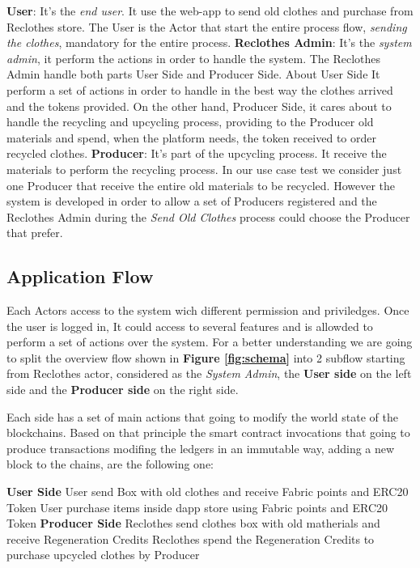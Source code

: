 \begin{outline}
    \1 \textbf{User}: It's the \textit{end user}. It use the web-app to send old clothes and purchase from Reclothes store.
    The User is the Actor that start the entire process flow, \textit{sending the clothes}, mandatory for the entire process. 
    \1 \textbf{Reclothes Admin}: It's the \textit{system admin}, it perform the actions in order to handle the system.
    The Reclothes Admin handle both parts User Side and Producer Side. About User Side It perform a set of actions
    in order to handle in the best way the clothes arrived and the tokens provided. On the other hand, Producer Side,
    it cares about to handle the recycling and upcycling process, providing to the Producer old materials
    and spend, when the platform needs, the token received to order recycled clothes.  
    \1 \textbf{Producer}: It's part of the upcycling process. It receive the materials to perform the recycling process.
    In our use case test we consider just one Producer that receive the entire old materials to be recycled.
    However the system is developed in order to allow a set of Producers registered and the Reclothes Admin
    during the \textit{Send Old Clothes} process could choose the Producer that prefer. 
\end{outline}

\subsection{Application Flow}

Each Actors access to the system wich different permission and priviledges. Once the user is logged in, 
It could access to several features and is allowded to perform a set of actions over the system. 
For a better understanding we are going to split the overview flow shown in \textbf{Figure \ref{fig:schema}} 
into 2 subflow starting from Reclothes actor, considered as the \textit{System Admin}, 
the \textbf{User side} on the left side and the \textbf{Producer side} on the right side. 

\bigskip

Each side has a set of main actions that going to modify the world state of the blockchains.
Based on that principle the smart contract invocations that going to produce transactions modifing the 
ledgers in an immutable way, adding a new block to the chains, are the following one: 

\begin{outline}[enumerate]
	\1 \textbf{User Side}
    \2 User send Box with old clothes and receive Fabric points and ERC20 Token
    \2 User purchase items inside dapp store using Fabric points and ERC20 Token
    \1 \textbf{Producer Side}
    \2 Reclothes send clothes box with old matherials and receive Regeneration Credits
    \2 Reclothes spend the Regeneration Credits to purchase upcycled clothes by Producer
\end{outline}

